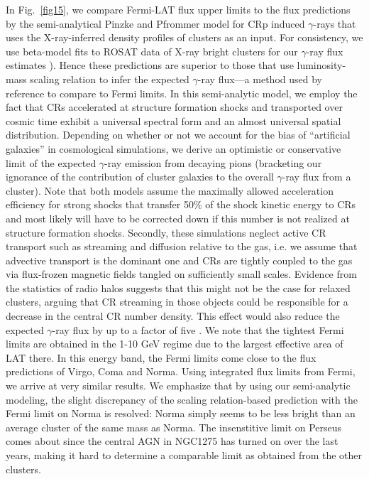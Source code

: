\documentclass[10pt,aps,pra,reprint,amsmath,amsfonts,amssymb,showpacs]{revtex4-1}
\begin{document}
In Fig.~\ref{fig15}, we compare Fermi-LAT flux upper limits to the flux
predictions by the semi-analytical Pinzke and Pfrommer model
\cite{2010MNRAS.409..449P} for CRp induced $\gamma$-rays that uses the
X-ray-inferred density profiles of clusters as an input. For consistency, we use
beta-model fits to ROSAT data of X-ray bright clusters for our $\gamma$-ray flux
estimates \cite{2002ApJ...567..71}). Hence these predictions are superior to
those that use luminosity-mass scaling relation to infer the expected
$\gamma$-ray flux---a method used by reference \cite{2010ApJ...717L..71A} to
compare to Fermi limits.  In this semi-analytic model, we employ the fact that
CRs accelerated at structure formation shocks and transported over cosmic time
exhibit a universal spectral form and an almost universal spatial
distribution. Depending on whether or not we account for the bias of
``artificial galaxies'' in cosmological simulations, we derive an optimistic or
conservative limit of the expected $\gamma$-ray emission from decaying pions
(bracketing our ignorance of the contribution of cluster galaxies to the overall
$\gamma$-ray flux from a cluster). Note that both models assume the maximally
allowed acceleration efficiency for strong shocks that transfer 50\% of the
shock kinetic energy to CRs and most likely will have to be corrected down if
this number is not realized at structure formation shocks. Secondly, these
simulations neglect active CR transport such as streaming and diffusion relative
to the gas, i.e. we assume that advective transport is the dominant one and CRs
are tightly coupled to the gas via flux-frozen magnetic fields tangled on
sufficiently small scales. Evidence from the statistics of radio halos suggests
that this might not be the case for relaxed clusters, arguing that CR streaming
in those objects could be responsible for a decrease in the central CR number
density. This effect would also reduce the expected $\gamma$-ray flux by up to a
factor of five \cite{2011A&A...527A..99E}. We note that the tightest Fermi
limits are obtained in the 1-10 GeV regime due to the largest effective area of
LAT there. In this energy band, the Fermi limits come close to the flux
predictions of Virgo, Coma and Norma. Using integrated flux limits from Fermi,
we arrive at very similar results.  We emphasize that by using our semi-analytic
modeling, the slight discrepancy of the scaling relation-based prediction with
the Fermi limit on Norma \cite{2010ApJ...717L..71A} is resolved: Norma simply
seems to be less bright than an average cluster of the same mass as Norma. The
insenstitive limit on Perseus comes about since the central AGN in NGC1275 has
turned on over the last years, making it hard to determine a comparable
limit as obtained from the other clusters.
\end{document}
